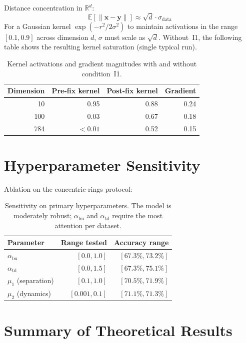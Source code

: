 \documentclass[11pt,a4paper]{article}
\begin{document}
Distance concentration in $\mathbb{R}^d$:
\begin{equation}
  \mathbb{E}[\|\mathbf{x} - \mathbf{y}\|] \approx \sqrt{d}\cdot\sigma_{\mathrm{data}}
\end{equation}
For a Gaussian kernel $\exp(-r^2/2\sigma^2)$ to maintain activations in the range
$[0.1, 0.9]$ across dimension $d$, $\sigma$ must scale as $\sqrt{d}$. Without~I1, the
following table shows the resulting kernel saturation (single typical run).

\begin{table}[h]
\centering
\begin{tabular}{rrrr}
\toprule
\textbf{Dimension} & \textbf{Pre-fix kernel} & \textbf{Post-fix kernel} & \textbf{Gradient} \\
\midrule
10  & 0.95    & 0.88 & 0.24 \\
100 & 0.03    & 0.67 & 0.18 \\
784 & $<0.01$ & 0.52 & 0.15 \\
\bottomrule
\end{tabular}
\caption{Kernel activations and gradient magnitudes with and without condition~I1.}
\end{table}

\section{Hyperparameter Sensitivity}

Ablation on the concentric-rings protocol:

\begin{table}[h]
\centering
\begin{tabular}{lrr}
\toprule
\textbf{Parameter} & \textbf{Range tested} & \textbf{Accuracy range} \\
\midrule
$\alpha_{\mathrm{bu}}$ & $[0.0, 1.0]$   & $[67.3\%, 73.2\%]$ \\
$\alpha_{\mathrm{td}}$ & $[0.0, 1.5]$   & $[67.3\%, 75.1\%]$ \\
$\mu_1$ (separation)   & $[0.1, 1.0]$   & $[70.5\%, 71.9\%]$ \\
$\mu_2$ (dynamics)     & $[0.001, 0.1]$ & $[71.1\%, 71.3\%]$ \\
\bottomrule
\end{tabular}
\caption{Sensitivity on primary hyperparameters. The model is moderately robust;
$\alpha_{\mathrm{bu}}$ and $\alpha_{\mathrm{td}}$ require the most attention per dataset.}
\end{table}

\section{Summary of Theoretical Results}
\end{document}
